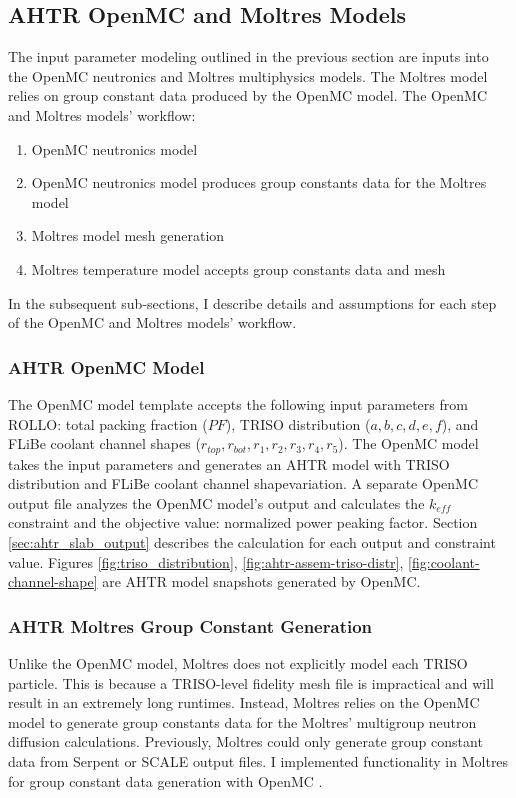 \subsection{AHTR OpenMC and Moltres Models}
\label{sec:ahtr-moltres-hom}
The input parameter modeling outlined in the previous section are inputs into 
the OpenMC neutronics and Moltres multiphysics models. 
The Moltres model relies on group constant data produced by the OpenMC model. 
The OpenMC and Moltres models' workflow:  
\begin{enumerate}
\item OpenMC neutronics model
\item OpenMC neutronics model produces group constants data for the Moltres 
model
\item Moltres model mesh generation 
\item Moltres temperature model accepts group constants data and mesh
\end{enumerate}
In the subsequent sub-sections, I describe details and assumptions for each step of 
the OpenMC and Moltres models' workflow.

\subsubsection{AHTR OpenMC Model}
The OpenMC model template accepts the following input parameters from \gls{ROLLO}: 
total packing fraction ($PF$), TRISO distribution ($a, b, c, d, e, f$), 
and \gls{FLiBe} coolant channel shapes ($r_{top}, r_{bot}, r_1, r_2, r_3, r_4, r_5$). 
The OpenMC model takes the input parameters and generates an \gls{AHTR} model with 
\gls{TRISO} distribution and \gls{FLiBe} coolant channel shapevariation. 
A separate OpenMC output file analyzes the OpenMC model's output and 
calculates the $k_{eff}$ constraint and the objective value: normalized power 
peaking factor.
Section \ref{sec:ahtr_slab_output} describes the calculation for each output and 
constraint value.
Figures \ref{fig:triso_distribution}, \ref{fig:ahtr-assem-triso-distr},
\ref{fig:coolant-channel-shape} are \gls{AHTR} model snapshots generated by OpenMC. 

\subsubsection{AHTR Moltres Group Constant Generation}
\label{sec:ahtr-moltres-group-constant-gen}
Unlike the OpenMC model, Moltres does not explicitly model each \gls{TRISO}
particle. 
This is because a TRISO-level fidelity mesh file is impractical and will result in an 
extremely long runtimes. 
Instead, Moltres relies on the OpenMC model to generate group constants data for the 
Moltres' multigroup neutron diffusion calculations. 
Previously, Moltres could only generate group constant data from Serpent 
\cite{leppanen_serpent_2014} or SCALE \cite{bucholz_scale:_1982} output files. 
I implemented functionality in Moltres for group constant data generation with 
OpenMC \cite{lindsay_moltres_2017}. 

